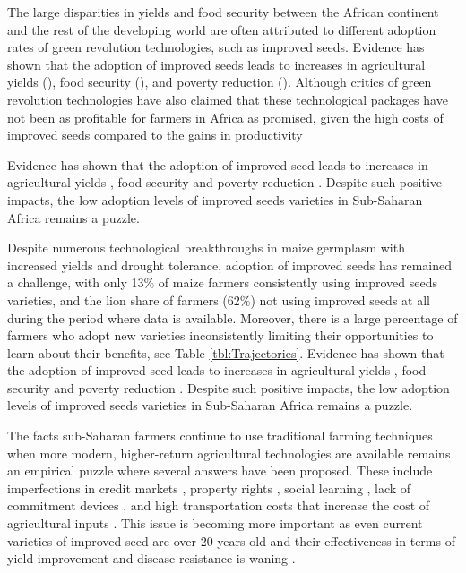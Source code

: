 \documentclass{article}
\begin{document}
The large disparities in yields and food security between the African continent and the rest of the developing world are often attributed to different adoption rates of green revolution technologies, such as improved seeds. Evidence has shown that the adoption of improved seeds leads to increases in agricultural yields (\citep{Carter2014-fm}), food security (\citep{Shiferaw2014-op}), and poverty reduction (\citep{Minten2008-tj}). Although critics of green revolution technologies have also claimed that these technological packages have not been as profitable for farmers in Africa as promised, given the high costs of improved seeds compared to the gains in productivity    


Evidence has shown that the adoption of improved seed leads to increases in agricultural yields \citep{Carter2014-fm}, food security \citep{Shiferaw2014-op} and poverty reduction \citep{Minten2008-tj}. Despite such positive impacts, the low adoption levels of improved seeds varieties in Sub-Saharan Africa remains a puzzle. 


Despite numerous technological breakthroughs in maize germplasm with increased yields and drought tolerance, adoption of improved seeds has remained a challenge, with only 13\% of maize farmers consistently using improved seeds varieties, and the lion share of farmers (62\%) not using improved seeds at all during the period where data is available. Moreover, there is a large percentage of farmers who adopt new varieties inconsistently limiting their opportunities to learn about their benefits, see Table \ref{tbl:Trajectories}.  Evidence has shown that the adoption of improved seed leads to increases in agricultural yields \citep{Carter2014-fm}, food security \citep{Shiferaw2014-op} and poverty reduction \citep{Minten2008-tj}. Despite such positive impacts, the low adoption levels of improved seeds varieties in Sub-Saharan Africa remains a puzzle. 


The facts sub-Saharan farmers continue to use traditional farming techniques when more modern, higher-return agricultural technologies are available remains an empirical puzzle where several answers have been proposed. These include imperfections in credit markets \citep{Croppenstedt2003-pq}, property rights \citep{Place2000-el}, social learning \citep{Conley2010-ue,Foster1995-bz,Munshi2004-og}, lack of commitment devices \cite{Duflo2009-iv}, and high transportation costs that increase the cost of agricultural inputs \citep{Byerlee2013-qk}. This issue is becoming more important as even current varieties of improved seed are over 20 years old and their effectiveness in terms of yield improvement and disease resistance is waning \citep{Abate2015-rj}. 
\end{document}
